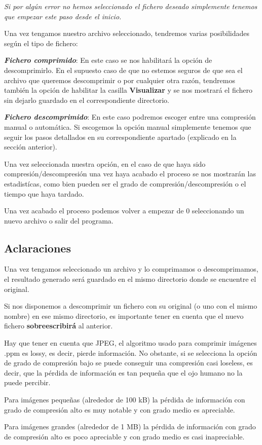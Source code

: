 {\itshape Si por algún error no hemos seleccionado el fichero deseado simplemente tenemos que empezar este paso desde el inicio.}

Una vez tengamos nuestro archivo seleccionado, tendremos varias posibilidades según el tipo de fichero\+:


\begin{DoxyEnumerate}
\item {\itshape {\bfseries Fichero comprimido}}\+: En este caso se nos habilitará la opción de descomprimirlo. En el supuesto caso de que no estemos seguros de que sea el archivo que queremos descomprimir o por cualquier otra razón, tendremos también la opción de habilitar la casilla {\bfseries Visualizar} y se nos mostrará el fichero sin dejarlo guardado en el correspondiente directorio.
\item {\itshape {\bfseries Fichero descomprimido}}\+: En este caso podremos escoger entre una compresión manual o automática. Si escogemos la opción manual simplemente tenemos que seguir los pasos detallados en su correspondiente apartado (explicado en la sección anterior).
\end{DoxyEnumerate}

Una vez seleccionada nuestra opción, en el caso de que haya sido compresión/descompresión una vez haya acabado el proceso se nos mostrarán las estadistícas, como bien pueden ser el grado de compresión/descompresión o el tiempo que haya tardado.

Una vez acabado el proceso podemos volver a empezar de 0 seleccionando un nuevo archivo o salir del programa.

\subsection*{Aclaraciones}


\begin{DoxyItemize}
\item Una vez tengamos seleccionado un archivo y lo comprimamos o descomprimamos, el resultado generado será guardado en el mismo directorio donde se encuentre el original.
\item Si nos disponemos a descomprimir un fichero con su original (o uno con el mismo nombre) en ese mismo directorio, es importante tener en cuenta que el nuevo fichero {\bfseries sobreescribirá} al anterior.
\item Hay que tener en cuenta que J\+P\+EG, el algoritmo usado para comprimir imágenes .ppm es lossy, es decir, pierde información. No obstante, si se selecciona la opción de grado de compresión bajo se puede conseguir una compresión casi loseless, es decir, que la pérdida de información es tan pequeña que el ojo humano no la puede percibir.
\begin{DoxyItemize}
\item Para imágenes pequeñas (alrededor de 100 kB) la pérdida de información con grado de compresión alto es muy notable y con grado medio es apreciable.
\item Para imágenes grandes (alrededor de 1 MB) la pérdida de información con grado de compresión alto es poco apreciable y con grado medio es casi inapreciable. 
\end{DoxyItemize}
\end{DoxyItemize}